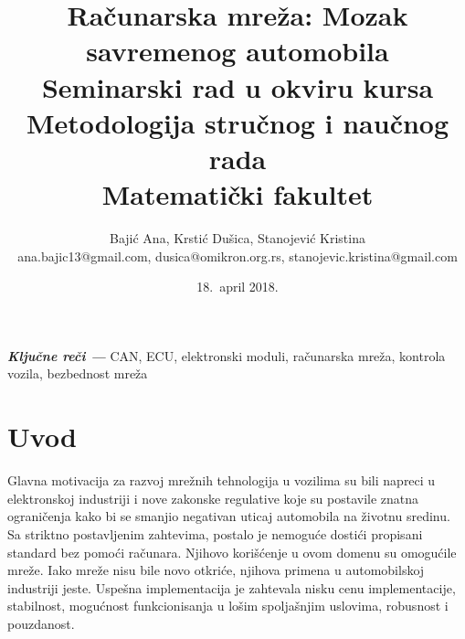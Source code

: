 \documentclass[a4paper]{article}
\providecommand{\keywords}[1]{\textbf{\textit{Ključne reči ---}} #1}
\begin{document}
\title{Računarska mreža: Mozak savremenog automobila\\ \small{Seminarski rad u okviru kursa\\Metodologija stručnog i naučnog rada\\ Matematički fakultet}}

\author{Bajić Ana, Krstić Dušica, Stanojević Kristina\\ ana.bajic13@gmail.com, dusica@omikron.org.rs, stanojevic.kristina@gmail.com}
\date{18.~april 2018.}
\maketitle



\keywords{CAN, ECU, elektronski moduli, računarska mreža, kontrola vozila, bezbednost mreža}

\setcounter{tocdepth}{1}
\tableofcontents

\newpage

\section{Uvod}
\label{sec:uvod}

Glavna motivacija za razvoj mrežnih tehnologija u vozilima su bili napreci u elektronskoj industriji i nove zakonske regulative koje su postavile znatna ograničenja kako bi se smanjio negativan uticaj automobila na životnu sredinu. Sa striktno postavljenim zahtevima, postalo je nemoguće dostići propisani standard bez pomoći računara. Njihovo korišćenje u ovom domenu su omogućile mreže. Iako mreže nisu bile novo otkriće, njihova primena u automobilskoj industriji jeste. Uspešna implementacija je zahtevala nisku cenu implementacije, stabilnost,  mogućnost funkcionisanja u lošim spoljašnjim uslovima, robusnost i pouzdanost. 
\end{document}
